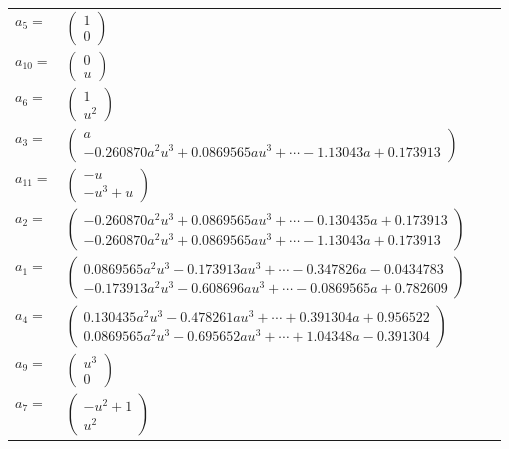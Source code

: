 \documentclass[1p]{elsarticle_modified}
\theoremstyle{definition}
\begin{document}
\begin{tabular}{m{7pt} m{180pt} m{7pt} m{180pt} }
\flushright $a_{5}=$&$\begin{pmatrix}1\\0\end{pmatrix}$ \\
\flushright $a_{10}=$&$\begin{pmatrix}0\\u\end{pmatrix}$ \\
\flushright $a_{6}=$&$\begin{pmatrix}1\\u^2\end{pmatrix}$ \\
\flushright $a_{3}=$&$\begin{pmatrix}a\\-0.260870 a^{2} u^{3}+0.0869565 a u^{3}+\cdots-1.13043 a+0.173913\end{pmatrix}$ \\
\flushright $a_{11}=$&$\begin{pmatrix}- u\\- u^3+u\end{pmatrix}$ \\
\flushright $a_{2}=$&$\begin{pmatrix}-0.260870 a^{2} u^{3}+0.0869565 a u^{3}+\cdots-0.130435 a+0.173913\\-0.260870 a^{2} u^{3}+0.0869565 a u^{3}+\cdots-1.13043 a+0.173913\end{pmatrix}$ \\
\flushright $a_{1}=$&$\begin{pmatrix}0.0869565 a^{2} u^{3}-0.173913 a u^{3}+\cdots-0.347826 a-0.0434783\\-0.173913 a^{2} u^{3}-0.608696 a u^{3}+\cdots-0.0869565 a+0.782609\end{pmatrix}$ \\
\flushright $a_{4}=$&$\begin{pmatrix}0.130435 a^{2} u^{3}-0.478261 a u^{3}+\cdots+0.391304 a+0.956522\\0.0869565 a^{2} u^{3}-0.695652 a u^{3}+\cdots+1.04348 a-0.391304\end{pmatrix}$ \\
\flushright $a_{9}=$&$\begin{pmatrix}u^3\\0\end{pmatrix}$ \\
\flushright $a_{7}=$&$\begin{pmatrix}- u^2+1\\u^2\end{pmatrix}$ \\

\end{tabular}
\end{document}
